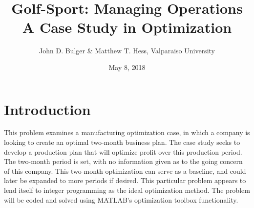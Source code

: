 \documentclass{article}
\title{Golf-Sport:  Managing Operations \\ A Case Study in Optimization}
\date{May 8, 2018}
\author{John D. Bulger \& Matthew T. Hess, Valparaiso University}
\begin{document}
	\maketitle
	\newpage
\section{Introduction}
This problem examines a manufacturing optimization case, in which a company is looking to create an optimal two-month business plan.  The case study seeks to develop a production plan that will optimize profit over this production period.  
The two-month period is set, with no information given as to the going concern of this company.  This two-month optimization can serve as a baseline, and could later be expanded to more periods if desired.  This particular problem appears to lend itself to integer programming as the ideal optimization method.  The problem will be coded and solved using MATLAB's optimization toolbox functionality.
\end{document}
